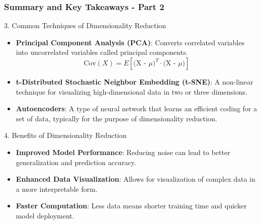 \documentclass[aspectratio=169]{beamer}
\begin{document}
\begin{frame}[fragile]
    \frametitle{Summary and Key Takeaways - Part 2}
    \begin{block}{3. Common Techniques of Dimensionality Reduction}
        \begin{itemize}
            \item \textbf{Principal Component Analysis (PCA)}: Converts correlated variables into uncorrelated variables called principal components.
            \begin{equation}
                \text{Cov}(X) = E[\text{(X - $\mu$)}^T \cdot \text{(X - $\mu$)}]
            \end{equation}
            \item \textbf{t-Distributed Stochastic Neighbor Embedding (t-SNE)}: A non-linear technique for visualizing high-dimensional data in two or three dimensions.
            \item \textbf{Autoencoders}: A type of neural network that learns an efficient coding for a set of data, typically for the purpose of dimensionality reduction.
        \end{itemize}
    \end{block}

    \begin{block}{4. Benefits of Dimensionality Reduction}
        \begin{itemize}
            \item \textbf{Improved Model Performance}: Reducing noise can lead to better generalization and prediction accuracy.
            \item \textbf{Enhanced Data Visualization}: Allows for visualization of complex data in a more interpretable form.
            \item \textbf{Faster Computation}: Less data means shorter training time and quicker model deployment.
        \end{itemize}
    \end{block}
\end{frame}
\end{document}
